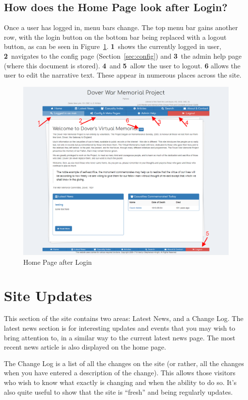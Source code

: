 \documentclass[12pt]{article}
\newcommand{\marker}[1]{\color{red}\textbf{#1}\color{black}}
\begin{document}
\newpage
\FloatBarrier
\subsection{How does the Home Page look after Login?}
Once a user has logged in, menu bars change. The top menu bar gains another row, with the login button on the bottom bar being replaced with a logout button, as can be seen in Figure~\ref{fig:home_login}. \marker{1}\ shows the currently logged in user, \marker{2}\ navigates to the config page (Section~\ref{sec:config}) and \marker{3}\ the admin help page (where this document is stored). \marker{4}\ and \marker{5}\ allow the user to logout. \marker{6} allows the user to edit the narrative text. These appear in numerous places across the site.

\begin{figure}[h]
  \centering
 \includegraphics[width=.9\textwidth]{pics/home_login.png}
	\caption{Home Page after Login}\label{fig:home_login}
\end{figure}

\newpage
\FloatBarrier
\section{Site Updates}\label{sec:siteUpdate}
This section of the site contains two areas: Latest News, and a Change Log. The latest news section is for interesting updates and events that you may wish to bring attention to, in a similar way to the current latest news page. The most recent news article is also displayed on the home page.

The Change Log is a list of all the changes on the site (or rather, all the changes when you have entered a description of the change). This allows those visitors who wish to know what exactly is changing and when the ability to do so. It's also quite useful to show that the site is ``fresh'' and being regularly updates.
\end{document}
